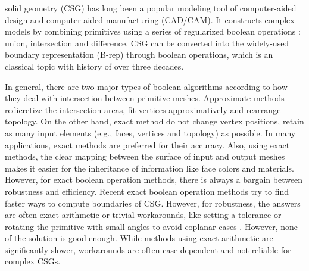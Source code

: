 \documentclass[10pt,journal,compsoc]{IEEEtran}
\begin{document}
\maketitle


\IEEEdisplaynontitleabstractindextext
\IEEEpeerreviewmaketitle

 solid geometry (CSG) has long been a popular modeling tool of computer-aided design and computer-aided manufacturing (CAD/CAM). It constructs complex models by combining primitives using a series of regularized boolean operations \cite{requicha1977mathematical,tilove1980closure}: union, intersection and difference. CSG can be converted into the widely-used boundary representation (B-rep) through boolean operations, which is an classical topic with history of over three decades.

In general, there are two major types of boolean algorithms according to how they deal with intersection between primitive meshes. Approximate methods redicretize the intersection areas, fit vertices approximatively and rearrange topology. On the other hand, exact method do not change vertex positions, retain as many input elements  (e.g., faces, vertices and topology) as possible. In many applications, exact methods are preferred for their accuracy. Also, using exact methods, the clear mapping between the surface of input and output meshes makes it easier for the inheritance of information like face colors and materials. However, for exact boolean operation methods, there is always a bargain between robustness and efficiency. Recent exact boolean operation methods try to find faster ways to compute boundaries of CSG. However, for robustness, the answers are often exact arithmetic \cite{barki2015exact,zhou2016mesh} or trivial workarounds, like setting a tolerance \cite{feito2013fast,segal1990using} or rotating the primitive with small angles to avoid coplanar cases \cite{douze2015quickcsg}. However, none of the solution is good enough. While methods using exact arithmetic are significantly slower, workarounds are often case dependent and not reliable for complex CSGs.
\end{document}

